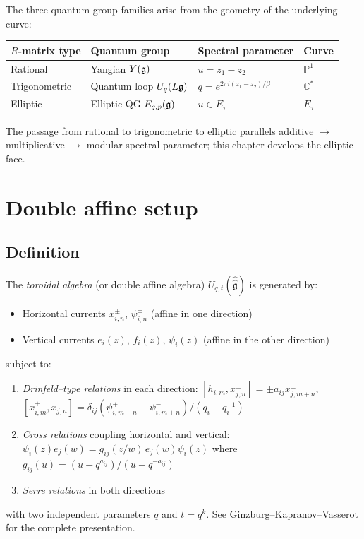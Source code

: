 \begin{remark}
\label{rem:rational-trig-elliptic}
The three quantum group families arise from the geometry of the underlying curve:
\begin{center}
\small
\begin{tabular}{llll}
\textbf{$R$-matrix type} & \textbf{Quantum group} &
  \textbf{Spectral parameter} & \textbf{Curve} \\ \hline
Rational
  & Yangian $Y(\mathfrak{g})$
  & $u = z_1 - z_2$
  & $\mathbb{P}^1$ \\[2pt]
Trigonometric
  & Quantum loop $U_q(L\mathfrak{g})$
  & $q = e^{2\pi i(z_1 - z_2)/\beta}$
  & $\mathbb{C}^*$ \\[2pt]
Elliptic
  & Elliptic QG $E_{q,p}(\mathfrak{g})$
  & $u \in E_\tau$
  & $E_\tau$
\end{tabular}
\end{center}
The passage from rational to trigonometric to elliptic parallels additive $\to$ multiplicative $\to$ modular spectral parameter; this chapter develops the elliptic face.
\end{remark}

\section{Double affine setup}
\label{sec:double-affine}

\subsection{Definition}

\begin{definition}\label{def:toroidal}
The \emph{toroidal algebra} (or double affine algebra) $U_{q,t}(\hat{\hat{\mathfrak{g}}})$ 
is generated by:
\begin{itemize}
\item Horizontal currents $x^\pm_{i,n}$, $\psi^\pm_{i,n}$ (affine in one direction)
\item Vertical currents $e_i(z)$, $f_i(z)$, $\psi_i(z)$ (affine in the other direction)
\end{itemize}
subject to:
\begin{enumerate}
\item \emph{Drinfeld--type relations} in each direction:
$[h_{i,m}, x^\pm_{j,n}] = \pm a_{ij} x^\pm_{j,m+n}$, \quad
$[x^+_{i,m}, x^-_{j,n}] = \delta_{ij} (\psi^+_{i,m+n} - \psi^-_{i,m+n})/(q_i - q_i^{-1})$
\item \emph{Cross relations} coupling horizontal and vertical:
$\psi_i(z) e_j(w) = g_{ij}(z/w) \, e_j(w) \psi_i(z)$
where $g_{ij}(u) = (u - q^{a_{ij}})/(u - q^{-a_{ij}})$
\item \emph{Serre relations} in both directions
\end{enumerate}
with two independent parameters $q$ and $t = q^k$. See Ginzburg--Kapranov--Vasserot
for the complete presentation.
\end{definition}

